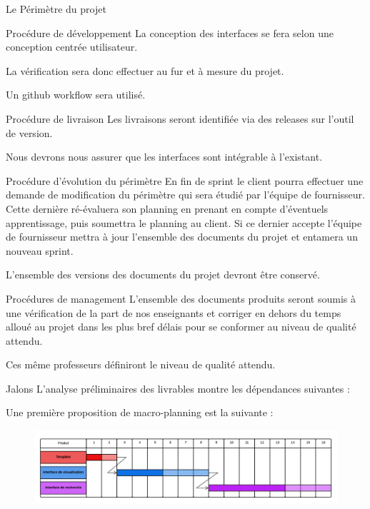 \documentclass[]{article}
\begin{document}
\begin{section}{Le Périmètre du projet}
\begin{subsection}{Procédure de développement}
            La conception des interfaces se fera selon une conception centrée utilisateur.

            La vérification sera donc effectuer au fur et à mesure du projet.

            Un github workflow sera utilisé.
        \end{subsection}

        \begin{subsection}{Procédure de livraison}
            Les livraisons seront identifiée via des releases sur l’outil de version.

            Nous devrons nous assurer que les interfaces sont intégrable à l’existant.
        \end{subsection}

        \begin{subsection}{Procédure d’évolution du périmètre}
            En fin de sprint le client pourra effectuer une demande de modification du périmètre qui sera étudié
            par l’équipe de fournisseur. Cette dernière ré-évaluera son planning en prenant en compte
            d’éventuels apprentissage, puis soumettra le planning au client. Si ce dernier accepte l’équipe de
            fournisseur mettra à jour l’ensemble des documents du projet et entamera un nouveau sprint.

            L’ensemble des versions des documents du projet devront être conservé.
        \end{subsection}
    \end{section}

    \begin{section}{Procédures de management}
        L’ensemble des documents produits seront soumis à une vérification de la part de nos enseignants et
        corriger en dehors du temps alloué au projet dans les plus bref délais pour se conformer au niveau
        de qualité attendu.

        Ces même professeurs définiront le niveau de qualité attendu.
    \end{section}

    \begin{section}{Jalons}
        L’analyse préliminaires des livrables montre les dépendances suivantes :

        Une première proposition de macro-planning est la suivante :

        \begin{figure}[h]
            \begin{center}
                \includegraphics[scale=0.15]{Gantt}
            \end{center}
        \end{figure}
    \end{section}
\end{document}
